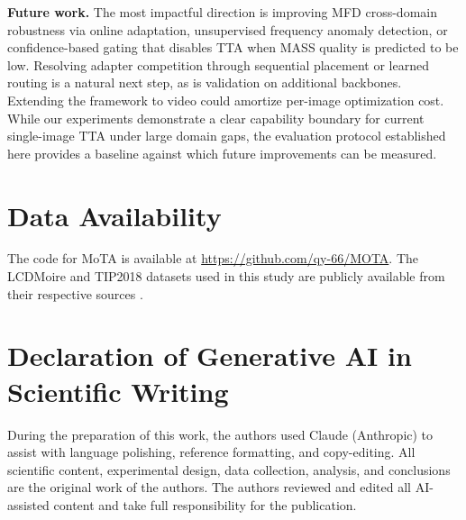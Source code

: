 \documentclass[review,10pt]{elsarticle}
\begin{document}
\textbf{Future work.} The most impactful direction is improving MFD cross-domain robustness via online adaptation, unsupervised frequency anomaly detection, or confidence-based gating that disables TTA when MASS quality is predicted to be low. Resolving adapter competition through sequential placement or learned routing is a natural next step, as is validation on additional backbones. Extending the framework to video could amortize per-image optimization cost. While our experiments demonstrate a clear capability boundary for current single-image TTA under large domain gaps, the evaluation protocol established here provides a baseline against which future improvements can be measured.

\section*{Data Availability}

The code for MoTA is available at \url{https://github.com/qy-66/MOTA}. The LCDMoire and TIP2018 datasets used in this study are publicly available from their respective sources \cite{zheng2022learning,sun2018moire}.

\section*{Declaration of Generative AI in Scientific Writing}

During the preparation of this work, the authors used Claude (Anthropic) to assist with language polishing, reference formatting, and copy-editing. All scientific content, experimental design, data collection, analysis, and conclusions are the original work of the authors. The authors reviewed and edited all AI-assisted content and take full responsibility for the publication.



\end{document}
